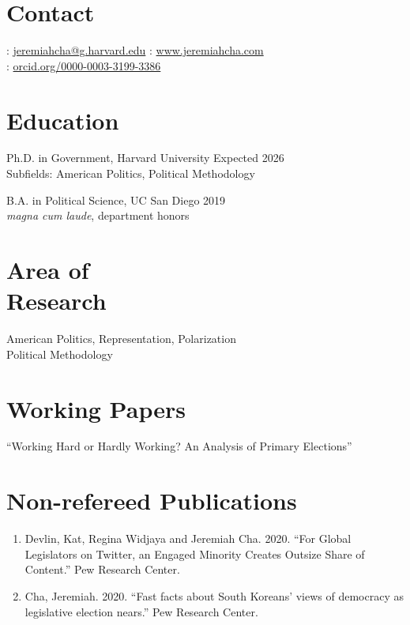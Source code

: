 \documentclass[margin, line]{res}
\begin{document}
\begin{resume}

\section{Contact} 
\Letter: \href{mailto:jeremiahcha@g.harvard.edu}{jeremiahcha@g.harvard.edu}\hfill 
\Mundus: \href{httsp://www.jeremiahcha.com}{www.jeremiahcha.com}\\
\mbox{} \hfill \Mundus: \href{https://orcid.org/0000-0003-3199-3386}{orcid.org/0000-0003-3199-3386}

\section{Education} 
Ph.D. in Government, Harvard University \hfill Expected 2026\\
\hspace*{5mm}Subfields: American Politics, Political Methodology

B.A. in Political Science, UC San Diego \hfill 2019\\
\hspace*{5mm}\textit{magna cum laude}, department honors

\section{Area of \\Research} 
American Politics, Representation, Polarization\\
Political Methodology

\section{Working Papers} 
``Working Hard or Hardly Working? An Analysis of Primary Elections''

\section{Non-refereed Publications}
\begin{enumerate}

\item Devlin, Kat, Regina Widjaya and Jeremiah Cha. 2020. ``For Global Legislators on Twitter, an Engaged Minority Creates Outsize Share of Content.'' Pew Research Center. 

\item Cha, Jeremiah. 2020. ``Fast facts about South Koreans’ views of democracy as legislative election nears.'' Pew Research Center.


\end{enumerate}
\end{resume}
\end{document}
